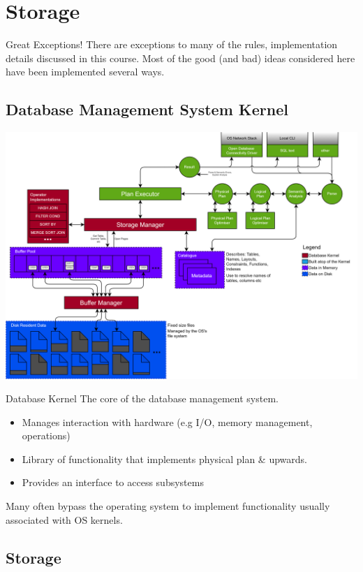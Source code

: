 \chapter{Storage}
\begin{sidenotebox}{Great Exceptions!}
    There are exceptions to many of the rules, implementation details discussed in this course. Most of the good (and bad) ideas considered here have been implemented several ways.
\end{sidenotebox}

\section{Database Management System Kernel}
\begin{center}
    \includegraphics[width=.8\textwidth]{storage/images/kernel_architecture.drawio.png}
\end{center}

\begin{definitionbox}{Database Kernel}
    The core of the database management system.
    \begin{itemize}
        \item Manages interaction with hardware (e.g I/O, memory management, operations)
        \item Library of functionality that implements physical plan \& upwards.
        \item Provides an interface to access subsystems
    \end{itemize}
    Many often bypass the operating system to implement functionality usually associated with OS kernels.
\end{definitionbox}

\section{Storage}
